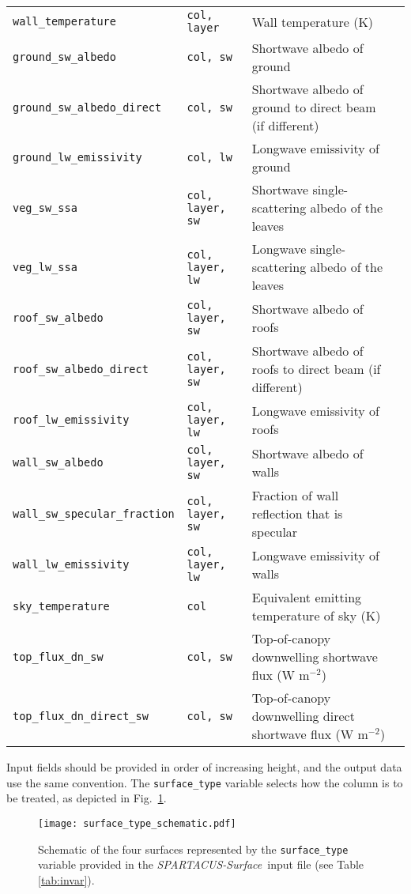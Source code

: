 \documentclass[a4,oneside]{article}
\def\codesize{\small}
\def\codetabsize{\footnotesize}
\def\spsurf{\emph{SPARTACUS-Surface}}
\def\code#1{{\codesize\texttt{#1}}}
\def\codetab#1{{\codetabsize\texttt{#1}}}
\begin{document}
\begin{center}
\begin{longtable}{llLp{8cm}}
\codetab{wall\_temperature} & \codetab{col, layer} & Wall temperature (K) \\
%
\codetab{ground\_sw\_albedo} & \codetab{col, sw} & Shortwave albedo of ground \\
\codetab{ground\_sw\_albedo\_direct} & \codetab{col, sw} & Shortwave albedo of ground to direct beam (if different)\\
\codetab{ground\_lw\_emissivity} & \codetab{col, lw} & Longwave emissivity of ground \\
%
\codetab{veg\_sw\_ssa} & \codetab{col, layer, sw} & Shortwave single-scattering albedo of the leaves \\
\codetab{veg\_lw\_ssa} & \codetab{col, layer, lw} & Longwave single-scattering albedo of the leaves \\
%
\codetab{roof\_sw\_albedo} & \codetab{col, layer, sw} & Shortwave albedo of roofs \\
\codetab{roof\_sw\_albedo\_direct} & \codetab{col, layer, sw} & Shortwave albedo of roofs to direct beam (if different)\\
\codetab{roof\_lw\_emissivity} & \codetab{col, layer, lw} & Longwave emissivity of roofs \\
%
\codetab{wall\_sw\_albedo} & \codetab{col, layer, sw} & Shortwave albedo of walls \\
\codetab{wall\_sw\_specular\_fraction} & \codetab{col, layer, sw} & Fraction of wall reflection that is specular \\
\codetab{wall\_lw\_emissivity} & \codetab{col, layer, lw} & Longwave emissivity of walls \\
%
\codetab{sky\_temperature} & \codetab{col} & Equivalent emitting temperature of sky (K) \\
\codetab{top\_flux\_dn\_sw} & \codetab{col, sw} & Top-of-canopy downwelling shortwave flux (W m$^{-2}$) \\
\codetab{top\_flux\_dn\_direct\_sw} & \codetab{col, sw} & Top-of-canopy downwelling direct shortwave flux (W m$^{-2}$) \\
\hline
\end{longtable}
\end{center}

Input fields should be provided in order of increasing height, and the
output data use the same convention. The \code{surface\_type} variable
selects how the column is to be treated, as depicted in
Fig.\ \ref{fig:type_schematic}.

\begin{figure}[tb!]
  \centerline{\texttt{[image: surface\_type\_schematic.pdf]}}
  \caption{\label{fig:type_schematic}Schematic of the four surfaces
    represented by the \code{surface\_type} variable provided in the
    \spsurf\ input file (see Table \ref{tab:invar}).}
\end{figure}
\end{document}

